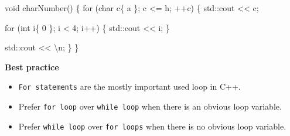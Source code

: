 \documentclass[
  letterpaper,
  DIV=11,
  numbers=noendperiod]{scrreprt}
\newenvironment{Shaded}{\begin{snugshade}}{\end{snugshade}}
\newcommand{\ControlFlowTok}[1]{\textcolor[rgb]{0.00,0.23,0.31}{#1}}
\newcommand{\DecValTok}[1]{\textcolor[rgb]{0.68,0.00,0.00}{#1}}
\newcommand{\ErrorTok}[1]{\textcolor[rgb]{0.68,0.00,0.00}{#1}}
\newcommand{\FunctionTok}[1]{\textcolor[rgb]{0.28,0.35,0.67}{#1}}
\newcommand{\NormalTok}[1]{\textcolor[rgb]{0.00,0.23,0.31}{#1}}
\newcommand{\SpecialCharTok}[1]{\textcolor[rgb]{0.37,0.37,0.37}{#1}}
\newcommand{\StringTok}[1]{\textcolor[rgb]{0.13,0.47,0.30}{#1}}
\providecommand{\tightlist}{%
  \setlength{\itemsep}{0pt}\setlength{\parskip}{0pt}}\usepackage{longtable,booktabs,array}
\begin{document}
\begin{Shaded}
\begin{Highlighting}[]
\NormalTok{void }\FunctionTok{charNumber}\NormalTok{()}
\NormalTok{\{}
    \ControlFlowTok{for}\NormalTok{ (char c\{ }\StringTok{\textquotesingle{}a\textquotesingle{}}\NormalTok{ \}; c }\SpecialCharTok{\textless{}=} \StringTok{\textquotesingle{}h\textquotesingle{}}\NormalTok{; }\SpecialCharTok{++}\NormalTok{c)}
\NormalTok{    \{}
\NormalTok{        std}\SpecialCharTok{::}\NormalTok{cout }\SpecialCharTok{\textless{}}\ErrorTok{\textless{}}\NormalTok{ c;}
        
        \ControlFlowTok{for}\NormalTok{ (int i\{ }\DecValTok{0}\NormalTok{ \}; i }\SpecialCharTok{\textless{}} \DecValTok{4}\NormalTok{; i}\SpecialCharTok{++}\NormalTok{)}
\NormalTok{        \{}
\NormalTok{            std}\SpecialCharTok{::}\NormalTok{cout }\SpecialCharTok{\textless{}}\ErrorTok{\textless{}}\NormalTok{ i;}
\NormalTok{        \}}

\NormalTok{        std}\SpecialCharTok{::}\NormalTok{cout }\SpecialCharTok{\textless{}}\ErrorTok{\textless{}} \StringTok{\textquotesingle{}}\SpecialCharTok{\textbackslash{}n}\StringTok{\textquotesingle{}}\NormalTok{;}
\NormalTok{    \}}
\NormalTok{\}}
\end{Highlighting}
\end{Shaded}

\begin{tcolorbox}[enhanced jigsaw, toprule=.15mm, rightrule=.15mm, opacityback=0, breakable, leftrule=.75mm, colback=white, colframe=quarto-callout-note-color-frame, arc=.35mm, left=2mm, bottomrule=.15mm]
\begin{minipage}[t]{5.5mm}
\textcolor{quarto-callout-note-color}{\faInfo}
\end{minipage}%
\begin{minipage}[t]{\textwidth - 5.5mm}

\textbf{Best practice}\vspace{2mm}

\begin{itemize}
\tightlist
\item
  \texttt{For\ statements} are the mostly important used loop in C++.
\item
  Prefer \texttt{for\ loop} over \texttt{while\ loop} when there is an
  obvious loop variable.
\item
  Prefer \texttt{while\ loop} over \texttt{for\ loops} when there is no
  obvious loop variable.
\end{itemize}

\end{minipage}%
\end{tcolorbox}
\end{document}
